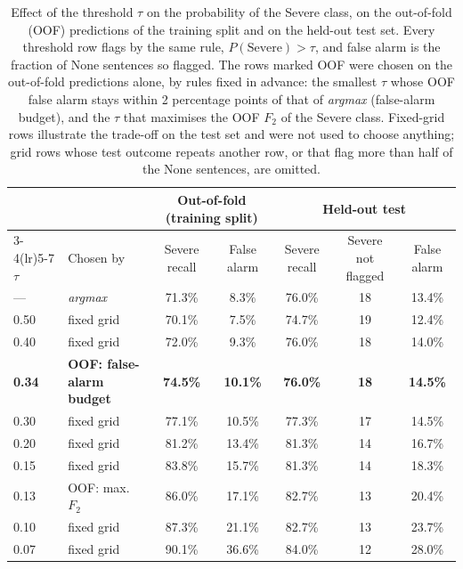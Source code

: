 \begin{table}[!t]
\centering
\caption{Effect of the threshold $\tau$ on the probability of the Severe class, on the out-of-fold (OOF) predictions of the training split and on the held-out test set. Every threshold row flags by the same rule, $P(\text{Severe}) > \tau$, and false alarm is the fraction of None sentences so flagged. The rows marked OOF were chosen on the out-of-fold predictions alone, by rules fixed in advance: the smallest $\tau$ whose OOF false alarm stays within 2 percentage points of that of \emph{argmax} (false-alarm budget), and the $\tau$ that maximises the OOF $F_2$ of the Severe class. Fixed-grid rows illustrate the trade-off on the test set and were not used to choose anything; grid rows whose test outcome repeats another row, or that flag more than half of the None sentences, are omitted.}
\label{tab:limiar}
\begin{tabular}{llccccc}
\toprule
 & & \multicolumn{2}{c}{Out-of-fold (training split)} & \multicolumn{3}{c}{Held-out test} \\
\cmidrule(lr){3-4}\cmidrule(lr){5-7}
$\tau$ & Chosen by & Severe recall & False alarm & Severe recall & Severe not flagged & False alarm \\
\midrule
--- & \emph{argmax} & 71.3\% & 8.3\% & 76.0\% & 18 & 13.4\% \\
0.50 & fixed grid & 70.1\% & 7.5\% & 74.7\% & 19 & 12.4\% \\
0.40 & fixed grid & 72.0\% & 9.3\% & 76.0\% & 18 & 14.0\% \\
\textbf{0.34} & \textbf{OOF: false-alarm budget} & \textbf{74.5\%} & \textbf{10.1\%} & \textbf{76.0\%} & \textbf{18} & \textbf{14.5\%} \\
0.30 & fixed grid & 77.1\% & 10.5\% & 77.3\% & 17 & 14.5\% \\
0.20 & fixed grid & 81.2\% & 13.4\% & 81.3\% & 14 & 16.7\% \\
0.15 & fixed grid & 83.8\% & 15.7\% & 81.3\% & 14 & 18.3\% \\
0.13 & OOF: max.\ $F_2$ & 86.0\% & 17.1\% & 82.7\% & 13 & 20.4\% \\
0.10 & fixed grid & 87.3\% & 21.1\% & 82.7\% & 13 & 23.7\% \\
0.07 & fixed grid & 90.1\% & 36.6\% & 84.0\% & 12 & 28.0\% \\
\bottomrule
\end{tabular}
\end{table}
